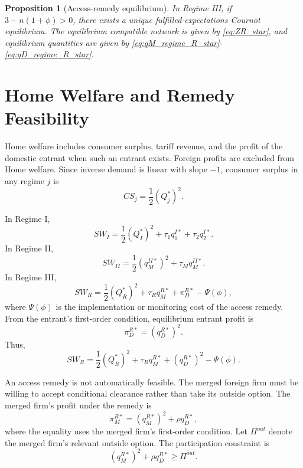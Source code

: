 \documentclass[12pt]{article}
\newtheorem{proposition}{Proposition}
\begin{document}
\begin{proposition}[Access-remedy equilibrium]
In Regime III, if $3-n(1+\phi)>0$, there exists a unique fulfilled-expectations Cournot equilibrium. The equilibrium compatible network is given by \eqref{eq:ZR_star}, and equilibrium quantities are given by \eqref{eq:qM_regime_R_star}-\eqref{eq:qD_regime_R_star}.
\end{proposition}

\section{Home Welfare and Remedy Feasibility}\label{sec:welfare}

Home welfare includes consumer surplus, tariff revenue, and the profit of the domestic entrant when such an entrant exists. Foreign profits are excluded from Home welfare. Since inverse demand is linear with slope $-1$, consumer surplus in any regime $j$ is
\begin{equation}
CS_j=\frac{1}{2}(Q_j^*)^2.
\label{eq:CS_general}
\end{equation}

In Regime I,
\begin{equation}
SW_I=\frac{1}{2}(Q_I^*)^2+\tau_1q_1^{I*}+\tau_2q_2^{I*}.
\label{eq:SW_I}
\end{equation}
In Regime II,
\begin{equation}
SW_{II}=\frac{1}{2}(q_M^{II*})^2+\tau_Mq_M^{II*}.
\label{eq:SW_II}
\end{equation}
In Regime III,
\begin{equation}
SW_R=\frac{1}{2}(Q_R^*)^2+\tau_Rq_M^{R*}+\pi_D^{R*}-\Psi(\phi),
\label{eq:SW_R_general}
\end{equation}
where $\Psi(\phi)$ is the implementation or monitoring cost of the access remedy. From the entrant's first-order condition, equilibrium entrant profit is
\begin{equation}
\pi_D^{R*}=(q_D^{R*})^2.
\label{eq:entrant_profit_square}
\end{equation}
Thus,
\begin{equation}
SW_R=\frac{1}{2}(Q_R^*)^2+\tau_Rq_M^{R*}+(q_D^{R*})^2-\Psi(\phi).
\label{eq:SW_R}
\end{equation}

An access remedy is not automatically feasible. The merged foreign firm must be willing to accept conditional clearance rather than take its outside option. The merged firm's profit under the remedy is
\begin{equation}
\pi_M^{R*}=(q_M^{R*})^2+\rho q_D^{R*},
\label{eq:foreign_profit_remedy}
\end{equation}
where the equality uses the merged firm's first-order condition. Let $\Pi^{out}$ denote the merged firm's relevant outside option. The participation constraint is
\begin{equation}
(q_M^{R*})^2+\rho q_D^{R*}\geq\Pi^{out}.
\label{eq:participation_constraint}
\end{equation}
\end{document}
